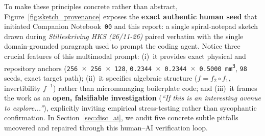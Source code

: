 \documentclass[10pt,a4paper]{article}
\renewcommand{\_}{\origunderscore\allowbreak}
\begin{document}
To make these principles concrete rather than abstract, Figure~\ref{fig:sketch_provenance} exposes the \textbf{exact authentic human seed} that initiated Companion Notebook~\texttt{00} and this report: a single spiral-notepad sketch drawn during \textit{Stilleskriving HKS (26/11-26)} paired verbatim with the single domain-grounded paragraph used to prompt the coding agent. Notice three crucial features of this multimodal prompt: (i)~it provides exact physical and repository anchors (\texttt{256 $\times$ 256 $\times$ 128}, \texttt{0.2344 $\times$ 0.2344 $\times$ 0.5000 mm\textsuperscript{3}}, \texttt{98} seeds, exact target path); (ii)~it specifies algebraic structure ($f = f_2 \circ f_1$, invertibility $f^{-1}$) rather than micromanaging boilerplate code; and (iii)~it frames the work as an \textbf{open, falsifiable investigation} (\textit{``If this is an interesting avenue to explore...''}), explicitly inviting empirical stress-testing rather than sycophantic confirmation. In Section~\ref{sec:disc_ai}, we audit five concrete subtle pitfalls uncovered and repaired through this human--AI verification loop.
\end{document}
